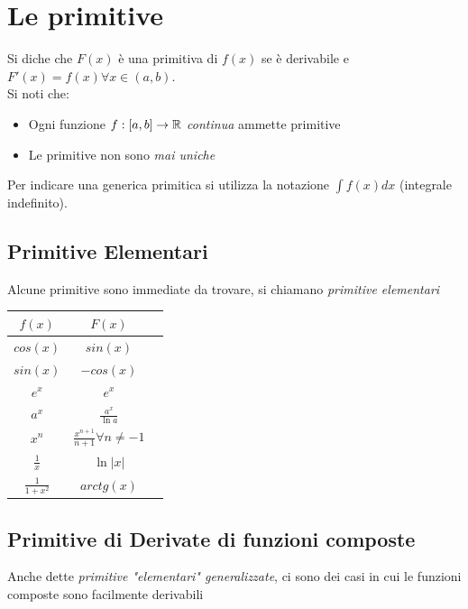 \documentclass[12pt, a4paper, openany]{book}
\begin{document}
	\section{Le primitive}
	Si diche che $F(x)$ è una primitiva di $f(x)$ se è derivabile e $F'(x) = f(x) \forall x\in (a,b)$.
	\\Si noti che:
	\begin{itemize}
		\item Ogni funzione $f:[a,b] \to \mathbb{R}$ \emph{continua} ammette primitive
		\item Le primitive non sono \emph{mai uniche}
	\end{itemize}
	Per indicare una generica primitica si utilizza la notazione $\int f(x) dx$ (integrale indefinito).

	\subsection{Primitive Elementari}
	Alcune primitive sono immediate da trovare, si chiamano \emph{primitive elementari}\\
	\begin{tabular}{ |c|c|c| }
		\hline
		$f(x)$            & $F(x)$                                  \\
		\hline
		$cos(x)$          & $sin(x)$                                \\
		\hline
		$sin(x)$          & $-cos(x)$                               \\
		\hline
		$e^x$             & $e^x$                                   \\
		\hline
		$a^x$             & $\frac{a^x}{\ln a} $                    \\
		\hline
		$x^n$             & $\frac{x^{n+1}}{n+1} \forall n\neq -1 $ \\
		\hline
		$\frac{1}{x}$     & $\ln |x| $                              \\
		\hline
		$\frac{1}{1+x^2}$ & $arctg(x) $                             \\
		\hline
	\end{tabular}

	\subsection{Primitive di Derivate di funzioni composte}
	Anche dette \emph{primitive "elementari" generalizzate}, ci sono dei casi in cui le funzioni composte sono facilmente derivabili
\end{document}
